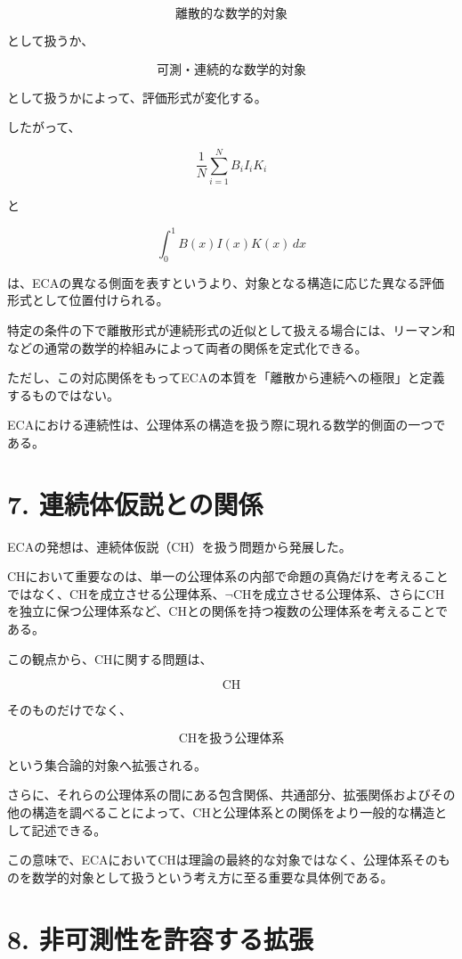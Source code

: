 \documentclass[12pt,a4paper]{article}
\begin{document}
\[
\text{離散的な数学的対象}
\]

として扱うか、

\[
\text{可測・連続的な数学的対象}
\]

として扱うかによって、評価形式が変化する。

したがって、

\[
\frac{1}{N}\sum_{i=1}^{N} B_iI_iK_i
\]

と

\[
\int_0^1B(x)I(x)K(x)\,dx
\]

は、ECAの異なる側面を表すというより、対象となる構造に応じた異なる評価形式として位置付けられる。

特定の条件の下で離散形式が連続形式の近似として扱える場合には、リーマン和などの通常の数学的枠組みによって両者の関係を定式化できる。

ただし、この対応関係をもってECAの本質を「離散から連続への極限」と定義するものではない。

ECAにおける連続性は、公理体系の構造を扱う際に現れる数学的側面の一つである。

\section{7. 連続体仮説との関係}

ECAの発想は、連続体仮説（CH）を扱う問題から発展した。

CHにおいて重要なのは、単一の公理体系の内部で命題の真偽だけを考えることではなく、CHを成立させる公理体系、$\neg\mathrm{CH}$を成立させる公理体系、さらにCHを独立に保つ公理体系など、CHとの関係を持つ複数の公理体系を考えることである。

この観点から、CHに関する問題は、

\[
\text{CH}
\]

そのものだけでなく、

\[
\text{CHを扱う公理体系}
\]

という集合論的対象へ拡張される。

さらに、それらの公理体系の間にある包含関係、共通部分、拡張関係およびその他の構造を調べることによって、CHと公理体系との関係をより一般的な構造として記述できる。

この意味で、ECAにおいてCHは理論の最終的な対象ではなく、公理体系そのものを数学的対象として扱うという考え方に至る重要な具体例である。

\section{8. 非可測性を許容する拡張}
\end{document}
